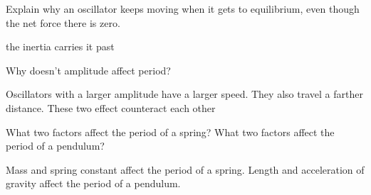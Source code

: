 \documentclass[10pt]{exam}
\begin{document}
\begin{questions}

\question 
  Explain why an oscillator keeps moving when it gets to equilibrium, even though the net force there is zero.

  \begin{solution}[\stretch{2}]
    the inertia carries it past
  \end{solution}

\question
  Why doesn't amplitude affect period?

  \begin{solution}[\stretch{2}]
    Oscillators with a larger amplitude have a larger speed.  They also travel a farther distance.  These two effect counteract each other
  \end{solution}

\question 
  What two factors affect the period of a spring?  What two factors affect the period of a pendulum?

  \begin{solution}[\stretch{2}]
    Mass and spring constant affect the period of a spring.  Length and acceleration of gravity affect the period of a pendulum.
  \end{solution}

\end{questions}
\end{document}
